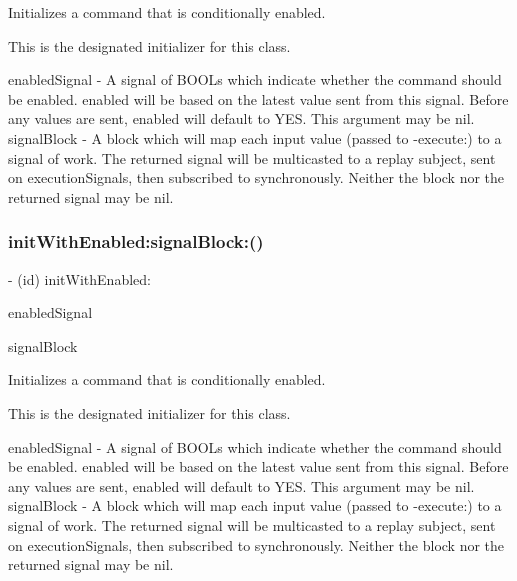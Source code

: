 Initializes a command that is conditionally enabled.

This is the designated initializer for this class.

enabled\+Signal -\/ A signal of B\+O\+O\+Ls which indicate whether the command should be enabled. {\ttfamily enabled} will be based on the latest value sent from this signal. Before any values are sent, {\ttfamily enabled} will default to Y\+ES. This argument may be nil. signal\+Block -\/ A block which will map each input value (passed to -\/execute\+:) to a signal of work. The returned signal will be multicasted to a replay subject, sent on {\ttfamily execution\+Signals}, then subscribed to synchronously. Neither the block nor the returned signal may be nil. \mbox{\label{interface_r_a_c_command_a753274fc1cc9abfebbd5488a0a09adab}} 
\subsubsection{\texorpdfstring{init\+With\+Enabled\+:signal\+Block\+:()}{initWithEnabled:signalBlock:()}\hspace{0.1cm}{\footnotesize\ttfamily [3/3]}}
{\footnotesize\ttfamily -\/ (id) init\+With\+Enabled\+: \begin{DoxyParamCaption}\item[{(\mbox{\hyperlink{interface_r_a_c_signal}{R\+A\+C\+Signal}} $\ast$)}]{enabled\+Signal }\item[{signalBlock:(\mbox{\hyperlink{interface_r_a_c_signal}{R\+A\+C\+Signal}} $\ast$($^\wedge$)(id input))}]{signal\+Block }\end{DoxyParamCaption}}

Initializes a command that is conditionally enabled.

This is the designated initializer for this class.

enabled\+Signal -\/ A signal of B\+O\+O\+Ls which indicate whether the command should be enabled. {\ttfamily enabled} will be based on the latest value sent from this signal. Before any values are sent, {\ttfamily enabled} will default to Y\+ES. This argument may be nil. signal\+Block -\/ A block which will map each input value (passed to -\/execute\+:) to a signal of work. The returned signal will be multicasted to a replay subject, sent on {\ttfamily execution\+Signals}, then subscribed to synchronously. Neither the block nor the returned signal may be nil. 

